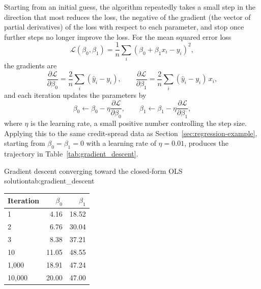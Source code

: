 \documentclass[../ai_in_finance]{subfiles}
\begin{document}
Starting from an initial guess, the algorithm repeatedly takes a small step in the direction that most reduces the loss, the negative of the gradient (the vector of partial derivatives) of the loss with respect to each parameter, and stop once further steps no longer improve the loss. For the mean squared error loss
$$\mathcal{L}(\beta_0, \beta_1) = \frac{1}{n}\sum_i (\beta_0 + \beta_1 x_i - y_i)^2,$$
the gradients are
\begin{equation*}
\frac{\partial \mathcal{L}}{\partial \beta_0} = \frac{2}{n}\sum_i (\hat y_i - y_i), \qquad \frac{\partial \mathcal{L}}{\partial \beta_1} = \frac{2}{n}\sum_i (\hat y_i - y_i)\, x_i,
\end{equation*}
and each iteration updates the parameters by
\begin{equation}
\label{eq:ml-gd-update}
\beta_0 \leftarrow \beta_0 - \eta \frac{\partial \mathcal{L}}{\partial \beta_0}, \qquad \beta_1 \leftarrow \beta_1 - \eta \frac{\partial \mathcal{L}}{\partial \beta_1},
\end{equation}
where $\eta$ is the learning rate, a small positive number controlling the step size. Applying this to the same credit-spread data as Section~\ref{sec:regression-example}, starting from $\beta_0=\beta_1=0$ with a learning rate of $\eta=0.01$, produces the trajectory in Table~\ref{tab:gradient_descent}.

\begin{booktable}[htbp]{Gradient descent converging toward the closed-form OLS solution}{tab:gradient_descent}
\begin{tabular}{lrr}
\toprule
Iteration & $\beta_0$ & $\beta_1$ \\
\midrule
1      & 4.16  & 18.52 \\
2      & 6.76  & 30.04 \\
3      & 8.38  & 37.21 \\
10     & 11.05 & 48.55 \\
1{,}000   & 18.91 & 47.24 \\
10{,}000  & 20.00 & 47.00 \\
\bottomrule
\end{tabular}
\end{booktable}
\end{document}
